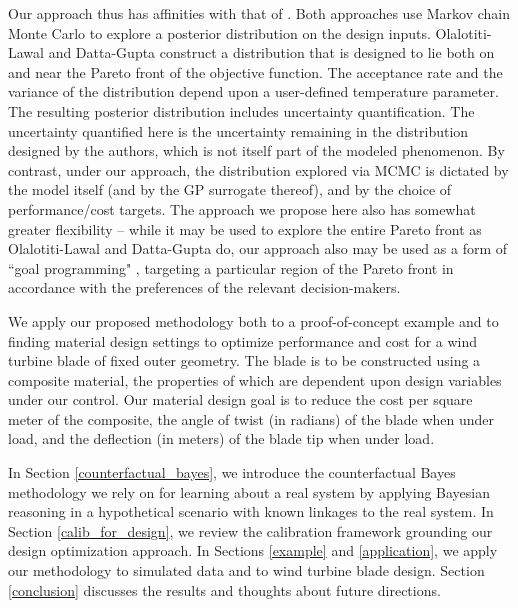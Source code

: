 \documentclass[12pt]{article}
\begin{document}
%
Our approach thus has affinities with that of \cite{Olalotiti-Lawal2015}.
%
Both approaches use Markov chain Monte Carlo \citep[MCMC;][]{Gelfand1990} to explore a posterior distribution on the design inputs.
%
Olalotiti-Lawal and Datta-Gupta construct a distribution that is designed to lie both on and near the Pareto front of the objective function.
%
The acceptance rate and the variance of the distribution depend upon a user-defined temperature parameter.
%
The resulting posterior distribution includes uncertainty quantification.
%
The uncertainty quantified here is the uncertainty remaining in the distribution designed by the authors, which is not itself part of the modeled phenomenon.
%
By contrast, under our approach, the distribution explored via MCMC is dictated by the model itself (and by the GP surrogate thereof), and by the choice of performance/cost targets.
%
The approach we propose here also has somewhat greater flexibility -- while it may be used to explore the entire Pareto front as Olalotiti-Lawal and Datta-Gupta do, our approach also may be used as a form of ``goal programming" \citep{Miettinen2008}, targeting a particular region of the Pareto front in accordance with the preferences of the relevant decision-makers.
%

%
We apply our proposed methodology both to a proof-of-concept example and to finding material design settings to optimize performance and cost for a wind turbine blade of fixed outer geometry.
%
The blade is to be constructed using a composite material, the properties of which are dependent upon design variables under our control.
%
%
Our material design goal is to reduce the cost per square meter of the composite, the angle of twist (in radians) of the blade when under load, and the deflection (in meters) of the blade tip when under load.
%

%
In Section \ref{counterfactual_bayes}, we introduce the counterfactual Bayes methodology we rely on for learning about a real system by applying Bayesian reasoning in a hypothetical scenario with known linkages to the real system.
%
In Section \ref{calib_for_design}, we review the calibration framework grounding our design optimization approach. 
%
In Sections \ref{example} and \ref{application}, we apply our methodology to simulated data and to wind turbine blade design.
%
%
Section \ref{conclusion} discusses the results and thoughts about future directions.
%
\end{document}
